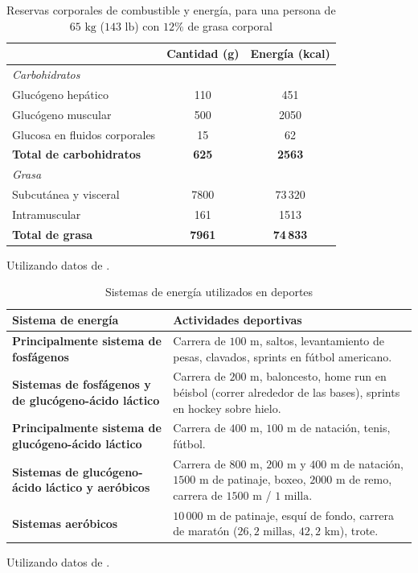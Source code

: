 \documentclass[12pt]{book}
\begin{document}
\begin{table}[htbp]
\centering
\caption{Reservas corporales de combustible y energía, para una persona de $65\text{ kg}$ ($143\text{ lb}$) con $12\%$ de grasa corporal}
\label{tab:610}
\small
\begin{tabularx}{0.8\textwidth}{Xcc}
\toprule
 & \textbf{Cantidad (g)} & \textbf{Energía (kcal)} \\
\midrule
\multicolumn{3}{l}{\textit{Carbohidratos}} \\
Glucógeno hepático & 110 & 451 \\
Glucógeno muscular & 500 & 2050 \\
Glucosa en fluidos corporales & 15 & 62 \\
\textbf{Total de carbohidratos} & \textbf{625} & \textbf{2563} \\
\midrule
\multicolumn{3}{l}{\textit{Grasa}} \\
Subcutánea y visceral & 7800 & $73\,320$ \\
Intramuscular & 161 & 1513 \\
\textbf{Total de grasa} & \textbf{7961} & \textbf{74\,833} \\
\bottomrule
\end{tabularx}
\begin{flushleft}
    \small Utilizando datos de \cite{106}.
\end{flushleft}
\end{table}

\begin{table}[htbp]
\centering
\caption{Sistemas de energía utilizados en deportes}
\label{tab:611}
\small
\begin{tabularx}{\textwidth}{l X}
\toprule
\textbf{Sistema de energía} & \textbf{Actividades deportivas} \\
\midrule
\textbf{Principalmente sistema de fosfágenos} & Carrera de $100\text{ m}$, saltos, levantamiento de pesas, clavados, sprints en fútbol americano. \\
\midrule
\textbf{Sistemas de fosfágenos y de glucógeno-ácido láctico} & Carrera de $200\text{ m}$, baloncesto, home run en béisbol (correr alrededor de las bases), sprints en hockey sobre hielo. \\
\midrule
\textbf{Principalmente sistema de glucógeno-ácido láctico} & Carrera de $400\text{ m}$, $100\text{ m}$ de natación, tenis, fútbol. \\
\midrule
\textbf{Sistemas de glucógeno-ácido láctico y aeróbicos} & Carrera de $800\text{ m}$, $200\text{ m}$ y $400\text{ m}$ de natación, $1500\text{ m}$ de patinaje, boxeo, $2000\text{ m}$ de remo, carrera de $1500\text{ m}$ / $1\text{ milla}$. \\
\midrule
\textbf{Sistemas aeróbicos} & $10\,000\text{ m}$ de patinaje, esquí de fondo, carrera de maratón ($26,2\text{ millas}$, $42,2\text{ km}$), trote. \\
\bottomrule
\end{tabularx}
\begin{flushleft}
    \small Utilizando datos de \cite{45}.
\end{flushleft}
\end{table}
\end{document}

